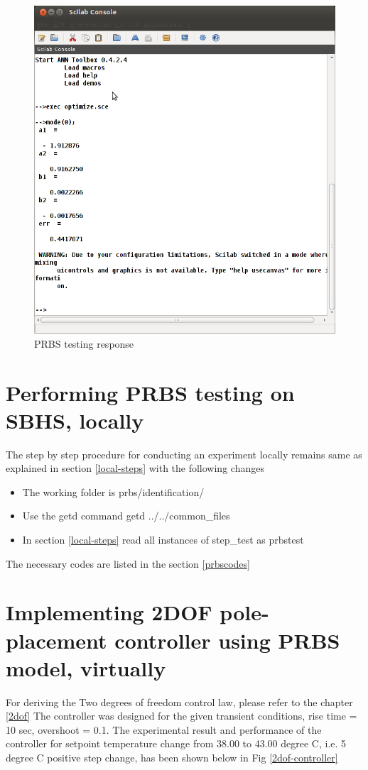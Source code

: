 \begin{figure}
\centering
\includegraphics[width=0.7\linewidth]{prbs/prbs-model.png}
\caption{PRBS testing response}
\label{prbs-model}
\end{figure}



\section{Performing PRBS testing on SBHS, locally}
The step by step procedure for conducting an experiment locally remains same as explained in section \ref{local-steps} with the following changes
\begin{itemize}
\item The working folder is prbs/identification/
\item Use the getd command getd ../../common\_files
\item In section \ref{local-steps} read all instances of step\_test as prbstest
\end{itemize}
The necessary codes are listed in the section \ref{prbscodes}

\section{Implementing 2DOF pole-placement controller using PRBS model, virtually}

For deriving the Two degrees of freedom control law, please refer to the chapter \ref{2dof}
The controller was designed for the given transient conditions, rise time = 10 sec, overshoot = 0.1. The experimental result and performance of the controller for setpoint temperature change from 38.00 to 43.00 degree C, i.e. 5 degree C positive step change, has been shown below in Fig \ref{2dof-controller}

